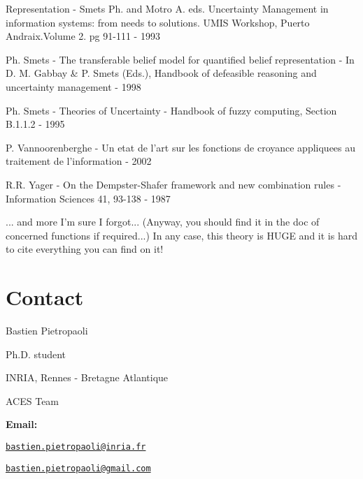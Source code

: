 \begin{DoxyItemize}
Representation -\/ Smets Ph. and Motro A. eds. Uncertainty Management in information systems: from needs to solutions. UMIS Workshop, Puerto Andraix.Volume 2. pg 91-\/111 -\/ 1993 \item Ph. Smets -\/ The transferable belief model for quantified belief representation -\/ In D. M. Gabbay \& P. Smets (Eds.), Handbook of defeasible reasoning and uncertainty management -\/ 1998 \item Ph. Smets -\/ Theories of Uncertainty -\/ Handbook of fuzzy computing, Section B.1.1.2 -\/ 1995 \item P. Vannoorenberghe -\/ Un etat de l'art sur les fonctions de croyance appliquees au traitement de l'information -\/ 2002 \item R.R. Yager -\/ On the Dempster-\/Shafer framework and new combination rules -\/ Information Sciences 41, 93-\/138 -\/ 1987 \item ... and more I'm sure I forgot... (Anyway, you should find it in the doc of concerned functions if required...) In any case, this theory is HUGE and it is hard to cite everything you can find on it!\end{DoxyItemize}
\hypertarget{index_contact_sec}{}\section{Contact}\label{index_contact_sec}
Bastien Pietropaoli \par
 Ph.D. student \par
 INRIA, Rennes -\/ Bretagne Atlantique \par
 ACES Team \par


{\bfseries Email:} \par
 \href{mailto:bastien.pietropaoli@inria.fr}{\tt bastien.pietropaoli@inria.fr} \par
 \href{mailto:bastien.pietropaoli@gmail.com}{\tt bastien.pietropaoli@gmail.com} \par
 